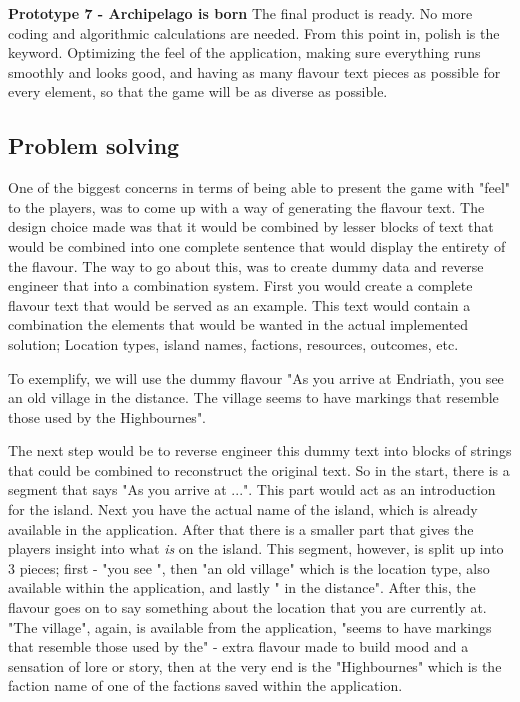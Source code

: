 \begin{center}
\textbf{Prototype 7 - Archipelago is born}
The final product is ready. No more coding and algorithmic calculations are needed. From this point in, polish is the keyword. Optimizing the feel of the application, making sure everything runs smoothly and looks good, and having as many flavour text pieces as possible for every element, so that the game will be as diverse as possible.
\end{center}

\subsection{Problem solving}
One of the biggest concerns in terms of being able to present the game with "feel" to the players, was to come up with a way of generating the flavour text. The design choice made was that it would be combined by lesser blocks of text that would be combined into one complete sentence that would display the entirety of the flavour. The way to go about this, was to create dummy data and reverse engineer that into a combination system. First you would create a complete flavour text that would be served as an example. This text would contain a combination the elements that would be wanted in the actual implemented solution; Location types, island names, factions, resources, outcomes, etc.

To exemplify, we will use the dummy flavour "As you arrive at Endriath, you see an old village in the distance. The village seems to have markings that resemble those used by the Highbournes".

The next step would be to reverse engineer this dummy text into blocks of strings that could be combined to reconstruct the original text. So in the start, there is a segment that says "As you arrive at ...". This part would act as an introduction for the island. Next you have the actual name of the island, which is already available in the application. After that there is a smaller part that gives the players insight into what \textit{is} on the island. This segment, however, is split up into 3 pieces; first - "you see ", then "an old village" which is the location type, also available within the application, and lastly " in the distance". After this, the flavour goes on to say something about the location that you are currently at. "The village", again, is available from the application, "seems to have markings that resemble those used by the" - extra flavour made to build mood and a sensation of lore or story, then at the very end is the "Highbournes" which is the faction name of one of the factions saved within the application.

